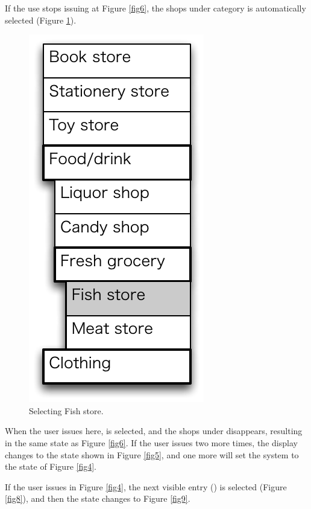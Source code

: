 \documentclass[conference]{IEEEtran}
\def\up{\tsf{▲}}
\def\down{\tsf{▼}}
\begin{document}
If the use stops issuing {\down} at Figure \ref{fig6},
the shops under category  is automatically selected (Figure \ref{fig7}).

\begin{figure}[H]
\centerline{\includegraphics[width=\menuwidth,bb=0 0 139 292]{figures/fig7.pdf}}
\caption{Selecting Fish store.}
\label{fig7}
\end{figure}

When the user issues {\up} here,  is selected,
and the shops under  disappears, 
resulting in the same state as Figure \ref{fig6}.
If the user issues {\up} two more times, the display changes to the state
shown in Figure \ref{fig5},
and one more {\up} will set the system to the state of Figure \ref{fig4}.

If the user issues {\down} in Figure \ref{fig4}, the next visible entry
() is selected (Figure \ref{fig8}), and then the state changes to Figure \ref{fig9}.
\end{document}
